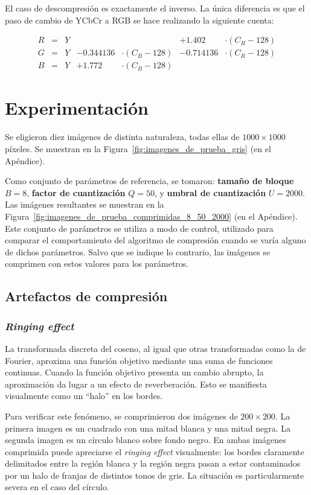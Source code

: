 \documentclass{article}
\begin{document}
El caso de descompresión es exactamente el inverso. La única diferencia es que el paso de cambio de YCbCr a RGB se hace realizando la siguiente cuenta:

\begin{align}
 R &=& Y              &&& + 1.402  & \cdot (C_R-128) \\
 G &=& Y  & - 0.344136 & \cdot (C_B-128)& - 0.714136 & \cdot (C_R-128) \\
 B &=& Y  & + 1.772  & \cdot (C_B-128)&
\end{align}

\section{Experimentación}

Se eligieron diez imágenes de distinta naturaleza, todas ellas de
$1000 \times 1000$ píxeles. Se muestran en la Figura~\ref{fig:imagenes_de_prueba_gris} (en el Apéndice).

Como conjunto de parámetros de referencia, se tomaron:
{\bf tamaño de bloque} $B = 8$,
{\bf factor de cuantización} $Q = 50$,
y {\bf umbral de cuantización} $U = 2000$.
Las imágenes resultantes se muestran en
la Figura~\ref{fig:imagenes_de_prueba_comprimidas_8_50_2000}
(en el Apéndice).
Este conjunto de parámetros se utiliza a modo de control,
utilizado para comparar el comportamiento del algoritmo de compresión
cuando se varía alguno de dichos parámetros.
Salvo que se indique lo contrario, las imágenes se comprimen con
estos valores para los parámetros.

\subsection{Artefactos de compresión}

\subsubsection{{\em Ringing effect}}

La transformada discreta del coseno, al igual que otras transformadas
como la de Fourier, aproxima una función objetivo
mediante una suma de funciones continuas. 
Cuando la función objetivo presenta un cambio abrupto,
la aproximación da lugar a un efecto de
reverberación.
Esto se manifiesta visualmente como un ``halo'' en los bordes.

Para verificar este fenómeno, se comprimieron dos imágenes de
$200 \times 200$.
La primera imagen es un cuadrado con una mitad blanca y una
mitad negra.
La segunda imagen es un círculo blanco sobre fondo negro.
En ambas imágenes comprimida puede apreciarse el {\em ringing effect}
visualmente:
los bordes claramente delimitados entre la región blanca y la
región negra pasan a estar contaminados por un halo de
franjas de distintos tonos de gris.
La situación es particularmente severa en el caso del círculo.
\end{document}
